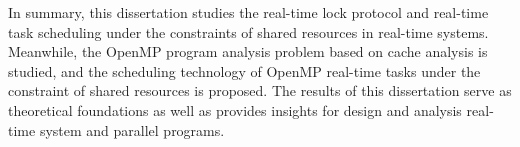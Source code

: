 In summary, this dissertation studies the real-time lock protocol and real-time task scheduling under the constraints of shared resources in real-time systems. Meanwhile, the OpenMP program analysis problem based on cache analysis is studied, and the scheduling technology of OpenMP real-time tasks under the constraint of shared resources is proposed. The results of this dissertation serve as theoretical foundations as well as provides insights for design and analysis real-time system and parallel programs.


